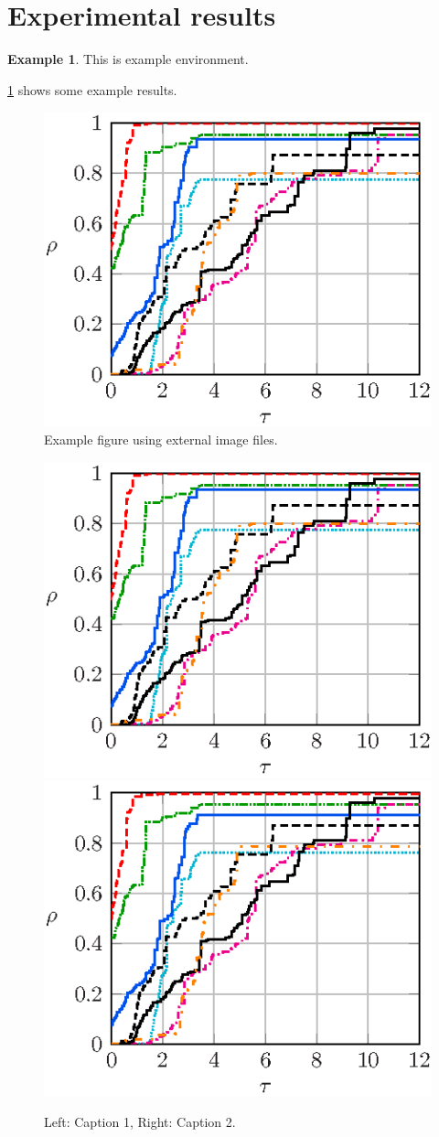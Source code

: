 \documentclass[10pt,reqno,final]{amsart}
\numberwithin{equation}{section}
\numberwithin{figure}{section}
\numberwithin{table}{section}
\theoremstyle{plain}
\theoremstyle{definition}
\newtheorem{example}{Example}
\theoremstyle{remark}
\begin{document}
\lipsum[41]

\section{Experimental results}
\label{sec:experiments}

\lipsum[45-46]

\begin{example}
  This is example environment.
\end{example}

\ref{fig:testfig} shows some example results.

\begin{figure}[htbp]
  \centering
  \label{fig:a}
  \includegraphics[width=0.48\linewidth]{fig1}
  \caption{Example figure using external image files.}
  \label{fig:testfig}
\end{figure}

\lipsum[48]

\begin{figure}[htb]
  \centering
  \includegraphics[width=0.48\linewidth]{fig1}
  \hfill
  \includegraphics[width=0.48\linewidth]{fig2}
  \caption{Left: Caption 1, Right: Caption 2.}
  \label{fig:testfig12}
\end{figure}
\end{document}
